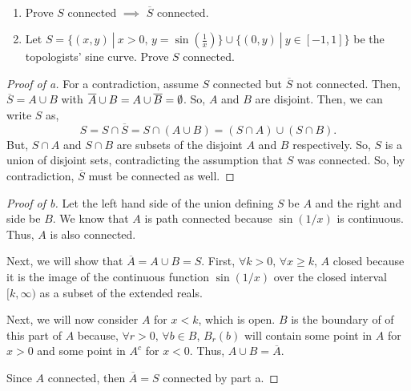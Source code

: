 \documentclass[../hw3]{subfiles}
\begin{document}
\begin{problem}[5]\
\begin{enumerate}[label=\alph*)]
	\item Prove $S$ connected  $\implies$ $\overline{S}$ connected.
	\item Let $S = \{(x,y)\ |\ x>0,\, y=\sin\left( \frac{1}{x} \right) \} \cup \{(0,y)\ |\ y\in [-1,1]\} $ be the topologists' sine curve. Prove $S$ connected.
\end{enumerate}
\end{problem}
\begin{proof}[Proof of a]
	For a contradiction, assume $S$ connected but $\overline{S}$ not connected. Then, $\overline{S}=A\cup B$ with $\overline{A}\cup B = A\cup \overline{B} = \emptyset$. So, $A$ and $B$ are disjoint. Then, we can write $S$ as,  \[
		S=S\cap\overline{S} =S\cap (A\cup B) = (S\cap A)\cup (S\cap B)
		.\] But, $S\cap A$ and $S\cap B$ are subsets of the disjoint $A$ and $B$ respectively. So, $S$ is a union of disjoint sets, contradicting the assumption that $S$ was connected. So, by contradiction,  $\overline{S}$ must be connected as well.
\end{proof}
\begin{proof}[Proof of b]
	Let the left hand side of the union defining $S$ be  $A$ and the right and side be  $B$. We know that  $A$ is path connected because  $\sin(1 / x)$ is continuous. Thus, $A$ is also connected.

	Next, we will show that  $\overline{A}=A\cup B=S$. First, $\forall k > 0,\, \forall x\ge k$, $A$ closed because it is  the image of the continuous function  $\sin(1 / x)$ over the closed interval $[k,\infty)$ as a subset of the extended reals.

	Next, we will now consider $A$ for $x<k$, which is open. $B$ is the boundary of of this part of  $A$ because,  $\forall r>0,\, \forall b\in B$, $B_r(b)$ will contain some point in $A$ for  $x>0$ and some point in  $A^{c}$ for $x<0$. Thus, $A\cup B = \overline{A}$.

	Since $A$ connected,  then $\overline{A}=S$ connected by part a.
\end{proof}
\end{document}
